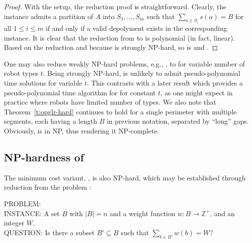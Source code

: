 \begin{proof}
	With the setup, the reduction proof is straightforward. Clearly, the 
	\tpart instance admits a partition of $A$ into $S_1, \ldots, 
	S_m$ such that $\sum_{a \in S_i} s(a) = B$ for all $1\leq i\leq m$ 
	if and only if a
	valid depolyment exists in the corresponding \opglrd instance. 
	It is clear that the reduction from \tpart to 
	\opglrd is polynomial (in fact, linear). Based on the 
	reduction and because \tpart is strongly NP-hard, so is \opglrd 
	and \opglr.
\end{proof}

\begin{remark}
	One may also reduce weakly NP-hard problems, e.g., \twopart
	\cite{karp1972reducibility}, to \opglr for variable number of robot 
	types $t$. Being strongly NP-hard, \opglr is unlikely to admit pseudo-polynomial 
	time solutions for variable $t$. This contrasts with a later result 
	which provides a pseudo-polynomial time algorithm for \opglr for 
	constant $t$, as one might expect in practice where robots have limited 
	number of types. We also note that Theorem~\ref{t:opglr-hard} continues 
	to hold for a single perimeter with multiple segments, each 
	having a length $B$ in previous notation, separated by ``long'' gaps. Obviously, 
	\opglrd is in NP, thus rendering it NP-complete. 
\end{remark}

\subsection{NP-hardness of \opgmc}
The minimum cost \opg variant, \opgmc, is also NP-hard, which may be 
established through reduction from the \subsetsum problem 
\cite{karp1972reducibility}:

\vspace*{1mm}
\noindent
PROBLEM: \subsetsum \\
INSTANCE: A set $B$ with $|B| = n$ and a weight function $w: B \to 
\mathbb Z^+$, and an integer $W$.\\ 
QUESTION: Is there a subset $B' \subseteq B$ such that $\sum_{b \in B'} 
w(b) = W$?
\vspace*{1mm}

